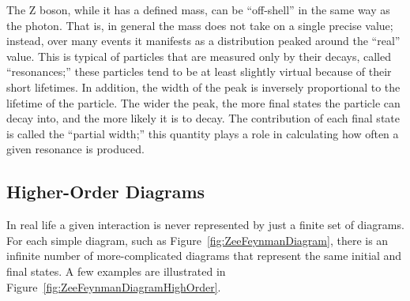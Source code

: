 The Z boson, while it has a defined mass, 
can be ``off-shell'' in the same way as the photon.  
That is, in general the 
mass 
does not take on a single precise value; 
instead, over many events it manifests as a distribution 
peaked around the ``real'' value.  
This is typical of particles that are measured only 
by their decays, called ``resonances;'' 
these particles tend to be at least slightly virtual 
because of their short lifetimes.  
In addition, the width of the peak is inversely proportional to the 
lifetime of the particle.  
The wider the peak, the more final states the particle can decay into, 
and the more likely it is to decay.  
The contribution of each final state is called the 
``partial width;'' 
this quantity plays a role in calculating 
how often a given resonance is produced.  




\subsection{Higher-Order Diagrams}
\label{theory:HigherOrderDiagrams}


In real life a given interaction is 
never represented by just a finite set of diagrams.  
For each simple diagram, 
such as Figure~\ref{fig:ZeeFeynmanDiagram}, 
there is an infinite number of 
more-complicated diagrams that 
represent the same initial and final states.  
A few examples are illustrated in 
Figure~\ref{fig:ZeeFeynmanDiagramHighOrder}.  

